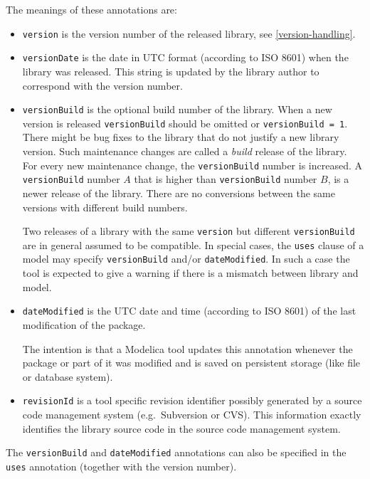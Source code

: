 The meanings of these annotations are:
\begin{itemize}
\item
  \lstinline!version! is the version number of the released library,
  see \cref{version-handling}.
\item
  \lstinline!versionDate! is the date in UTC format (according to ISO
  8601) when the library was released. This string is updated by the
  library author to correspond with the version number.
\item
  \lstinline!versionBuild! is the optional build number of the library.
  When a new version is released \lstinline!versionBuild! should be omitted or
  \lstinline!versionBuild = 1!. There might be bug fixes to the library that do
  not justify a new library version. Such maintenance changes are called
  a \emph{build} release of the library. For every new maintenance change,
  the \lstinline!versionBuild! number is increased. A \lstinline!versionBuild! number $A$
  that is higher than \lstinline!versionBuild! number $B$, is a newer release of the
  library. There are no conversions between the same versions with
  different build numbers.

  Two releases of a library with the same \lstinline!version! but different
  \lstinline!versionBuild! are in general assumed to be compatible. In special
  cases, the \lstinline!uses! clause of a model may specify \lstinline!versionBuild! and/or
  \lstinline!dateModified!.  In such a case the tool is expected to give
  a warning if there is a mismatch between library and model.
\item
  \lstinline!dateModified! is the UTC date and time (according to ISO
  8601) of the last modification of the package.

  \begin{nonnormative}
  The intention is that a Modelica tool updates this annotation whenever the package or part of it was modified and is saved on
  persistent storage (like file or database system).
  \end{nonnormative}
\item
  \lstinline!revisionId! is a tool specific revision identifier
  possibly generated by a source code management system (e.g.\ Subversion
  or CVS). This information exactly identifies the library
  source code in the source code management system.
\end{itemize}

The \lstinline!versionBuild! and \lstinline!dateModified! annotations can also be specified in
the \lstinline!uses! annotation (together with the version number).

